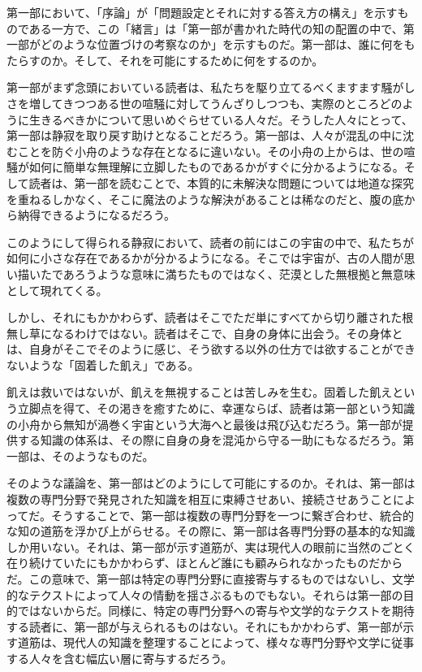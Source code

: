 第一部において、「序論」が「問題設定とそれに対する答え方の構え」を示すものである一方で、この「緒言」は「第一部が書かれた時代の知の配置の中で、第一部がどのような位置づけの考察なのか」を示すものだ。第一部は、誰に何をもたらすのか。そして、それを可能にするために何をするのか。

第一部がまず念頭においている読者は、私たちを駆り立てるべくますます騒がしさを増してきつつある世の喧騒に対してうんざりしつつも、実際のところどのように生きるべきかについて思いめぐらせている人々だ。そうした人々にとって、第一部は静寂を取り戻す助けとなることだろう。第一部は、人々が混乱の中に沈むことを防ぐ小舟のような存在となるに違いない。その小舟の上からは、世の喧騒が如何に簡単な無理解に立脚したものであるかがすぐに分かるようになる。そして読者は、第一部を読むことで、本質的に未解決な問題については地道な探究を重ねるしかなく、そこに魔法のような解決があることは稀なのだと、腹の底から納得できるようになるだろう。

このようにして得られる静寂において、読者の前にはこの宇宙の中で、私たちが如何に小さな存在であるかが分かるようになる。そこでは宇宙が、古の人間が思い描いたであろうような意味に満ちたものではなく、茫漠とした無根拠と無意味として現れてくる。

しかし、それにもかかわらず、読者はそこでただ単にすべてから切り離された根無し草になるわけではない。読者はそこで、自身の身体に出会う。その身体とは、自身がそこでそのように感じ、そう欲する以外の仕方では欲することができないような「固着した飢え」である。

飢えは救いではないが、飢えを無視することは苦しみを生む。固着した飢えという立脚点を得て、その渇きを癒すために、幸運ならば、読者は第一部という知識の小舟から無知が渦巻く宇宙という大海へと最後は飛び込むだろう。第一部が提供する知識の体系は、その際に自身の身を混沌から守る一助にもなるだろう。第一部は、そのようなものだ。

そのような議論を、第一部はどのようにして可能にするのか。それは、第一部は複数の専門分野で発見された知識を相互に束縛させあい、接続させあうことによってだ。そうすることで、第一部は複数の専門分野を一つに繋ぎ合わせ、統合的な知の道筋を浮かび上がらせる。その際に、第一部は各専門分野の基本的な知識しか用いない。それは、第一部が示す道筋が、実は現代人の眼前に当然のごとく在り続けていたにもかかわらず、ほとんど誰にも顧みられなかったものだからだ。この意味で、第一部は特定の専門分野に直接寄与するものではないし、文学的なテクストによって人々の情動を揺さぶるものでもない。それらは第一部の目的ではないからだ。同様に、特定の専門分野への寄与や文学的なテクストを期待する読者に、第一部が与えられるものはない。それにもかかわらず、第一部が示す道筋は、現代人の知識を整理することによって、様々な専門分野や文学に従事する人々を含む幅広い層に寄与するだろう。
